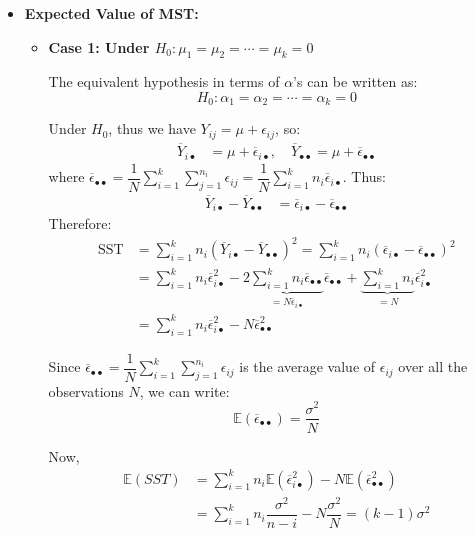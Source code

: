 \documentclass[twoside]{book}
\begin{document}
\begin{itemize}
\item \textbf{Expected Value of MST:}
\bigskip
\begin{itemize}
\item \textbf{Case 1: Under $H_0: \mu_1 = \mu_2 = \cdots = \mu_k = 0$}

\bigskip
The equivalent hypothesis in terms of $\alpha$'s can be written as:
$$H_0: \alpha_1 = \alpha_2 = \cdots = \alpha_k = 0$$

Under $H_0$, thus we have $Y_{ij} = \mu + \epsilon_{ij}$, so:
\begin{align*}
\overline{Y}_{i\bullet} &= \mu + \overline{\epsilon}_{i\bullet}, \quad \overline{Y}_{\bullet\bullet} = \mu + \overline{\epsilon}_{\bullet\bullet}
\end{align*}
where $\overline{\epsilon}_{\bullet\bullet} = \dfrac{1}{N}\sum_{i=1}^k \sum_{j=1}^{n_i} \epsilon_{ij} = \dfrac{1}{N}\sum_{i=1}^k n_i \overline{\epsilon}_{i\bullet}$.
Thus:
\begin{align*}
\overline{Y}_{i\bullet} - \overline{Y}_{\bullet\bullet} &= \overline{\epsilon}_{i\bullet} - \overline{\epsilon}_{\bullet\bullet}
\end{align*}
Therefore:
\begin{align*}
\text{SST} &= \sum_{i=1}^k n_i(\overline{Y}_{i\bullet} - \overline{Y}_{\bullet\bullet})^2 = \sum_{i=1}^k n_i(\overline{\epsilon}_{i\bullet} - \overline{\epsilon}_{\bullet\bullet})^2 \\
&=\sum_{i=1}^k n_i\overline{\epsilon}_{i\bullet}^2 - 2\underbrace{\sum_{i=1}^k n_i\overline{\epsilon}_{\bullet\bullet}}_{=N\overline{\epsilon}_{i\bullet}}\overline{\epsilon}_{\bullet\bullet} + \underbrace{\sum_{i=1}^kn_i}_{= N}\overline{\epsilon}_{i\bullet}^2\\
&=\sum_{i=1}^k n_i\overline{\epsilon}_{i\bullet}^2 - N\overline{\epsilon}_{\bullet\bullet}^2
\end{align*}

Since $\overline{\epsilon}_{\bullet\bullet} = \dfrac{1}{N}\sum_{i=1}^k \sum_{j=1}^{n_i} \epsilon_{ij}$ is the average value of $\epsilon_{ij}$ over all the observations $N$, we can write:
$$\mathbb{E}\left( \overline{\epsilon}_{\bullet\bullet}\right)  = \dfrac{\sigma^2}{N}$$

Now,
\begin{align*}
\mathbb{E}(SST) &=\sum_{i=1}^k n_i\mathbb{E}\left( \overline{\epsilon}_{i\bullet}^2 \right) - N\mathbb{E}\left( \overline{\epsilon}_{\bullet\bullet}^2\right) \\
&= \sum_{i=1}^k n_i\dfrac{\sigma^2}{n-i} - N\dfrac{\sigma^2}{N} = (k-1)\sigma^2
\end{align*}


\end{itemize}
\end{itemize}
\end{document}
